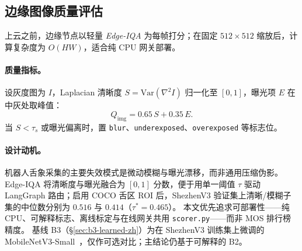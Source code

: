 \subsection{边缘图像质量评估}
\label{sec:edge-iqa-zh}

上云之前，边缘节点以轻量 \emph{Edge-IQA} 为每帧打分；在固定 $512\times512$ 缩放后，计算复杂度为 $O(HW)$，适合纯 CPU 网关部署。

\paragraph{质量指标。}
设灰度图为 $I$，Laplacian 清晰度 $S=\mathrm{Var}(\nabla^2 I)$ 归一化至 $[0,1]$，曝光项 $E$ 在中灰处取峰值：
\begin{equation}
Q_{\mathrm{img}} = 0.65\, S + 0.35\, E .
\end{equation}
当 $S<\tau_s$ 或曝光偏离时，置 \texttt{blur}、\texttt{underexposed}、\texttt{overexposed} 等标志位。

\paragraph{设计动机。}
机器人舌象采集的主要失效模式是微动模糊与曝光漂移，而非通用压缩伪影。
Edge-IQA 将清晰度与曝光融合为 $[0,1]$ 分数，便于用单一阈值 $\tau$ 驱动 LangGraph 路由；启用 COCO 舌区 ROI 后，ShezhenV3 验证集上清晰/模糊子集的中位数分别为 $0.516$ 与 $0.414$（$\tau^\ast{=}0.465$）。
本文优先追求可部署性——纯 CPU、可解释标志、离线标定与在线网关共用 \texttt{scorer.py}——而非 MOS 排行榜精度。
基线 B3（\S\ref{sec:b3-learned-zh}）为在 ShezhenV3 训练集上微调的 MobileNetV3-Small~\cite{howard2019mobilenetv3}，仅作可选对比；主结论仍基于可解释的 B2。

\begin{table}[t]
\centering
\caption{边侧采集门控的 IQA 路线对比（定性）。}
\label{tab:iqa-compare-zh}
\small
{}
\end{table}

